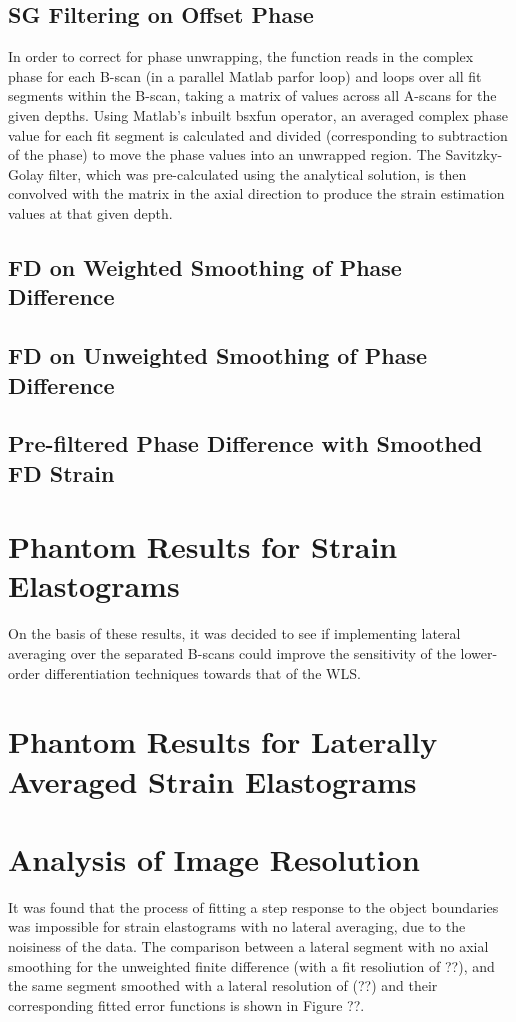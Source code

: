 \subsection{SG Filtering on Offset Phase}
In order to correct for phase unwrapping, the function reads in the complex phase for each B-scan (in a parallel Matlab parfor loop) and loops over all fit segments within the B-scan, taking a matrix of values across all A-scans for the given depths. Using Matlab's inbuilt bsxfun operator, an averaged complex phase value for each fit segment is calculated and divided (corresponding to subtraction of the phase) to move the phase values into an unwrapped region. The Savitzky-Golay filter, which was pre-calculated using the analytical solution, is then convolved with the matrix in the axial direction to produce the strain estimation values at that given depth. 

\subsection{FD on Weighted Smoothing of Phase Difference}


\subsection{FD on Unweighted Smoothing of Phase Difference}

\subsection{Pre-filtered Phase Difference with Smoothed FD Strain}


\section{Phantom Results for Strain Elastograms}

On the basis of these results, it was decided to see if implementing lateral averaging over the separated B-scans could improve the sensitivity of the lower-order differentiation techniques towards that of the WLS. 

\section{Phantom Results for Laterally Averaged Strain Elastograms}

\section{Analysis of Image Resolution}
It was found that the process of fitting a step response to the object boundaries was impossible for strain elastograms with no lateral averaging, due to the noisiness of the data. The comparison between a lateral segment with no axial smoothing for the unweighted finite difference (with a fit resoliution of ??), and the same segment smoothed with a lateral resolution of (??) and their corresponding fitted error functions is shown in Figure ??.

